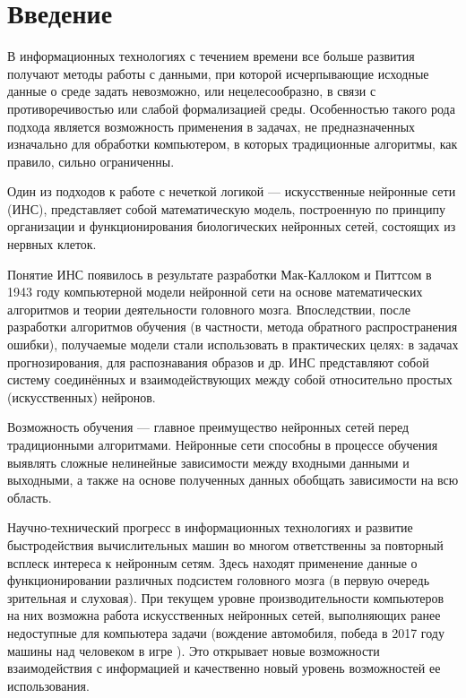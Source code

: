 \cleardoublepage
{}
{}
\chapter*{Введение}
\label{chap:introduction}

В информационных технологиях с течением времени все больше развития получают методы работы с данными, при которой исчерпывающие исходные данные о среде задать невозможно, или нецелесообразно, в связи с противоречивостью или слабой формализацией среды.
Особенностью такого рода подхода является возможность применения в задачах, не предназначенных изначально для обработки компьютером, в которых традиционные алгоритмы, как правило, сильно ограниченны.

Один из подходов к работе с нечеткой логикой ---  искусственные нейронные сети (ИНС), представляет собой математическую модель, построенную по принципу организации и функционирования биологических нейронных сетей, состоящих из нервных клеток.

Понятие ИНС появилось в результате разработки Мак-Каллоком и Питтсом в 1943 году компьютерной модели нейронной сети на основе математических алгоритмов и теории деятельности головного мозга.
Впоследствии, после разработки алгоритмов обучения (в частности, метода обратного распространения ошибки), получаемые модели стали использовать в практических целях: в задачах прогнозирования, для распознавания образов и др.
ИНС представляют собой систему соединённых и взаимодействующих между собой относительно простых (искусственных) нейронов. 
 
Возможность обучения — главное преимущество нейронных сетей перед традиционными алгоритмами. 
Нейронные сети способны в процессе обучения выявлять сложные нелинейные зависимости между входными данными и выходными, а также на основе полученных данных обобщать зависимости на всю область. 

Научно-технический прогресс в информационных технологиях и развитие быстродействия вычислительных машин во многом ответственны за повторный всплеск интереса к нейронным сетям. 
Здесь находят применение данные о функционировании различных подсистем головного мозга (в первую очередь зрительная и слуховая). 
При текущем уровне производительности компьютеров на них возможна работа искусственных нейронных сетей, выполняющих ранее недоступные для компьютера задачи (вождение автомобиля, победа в 2017 году машины над человеком в игре ).
Это открывает новые возможности взаимодействия с информацией и качественно новый уровень возможностей ее использования.

